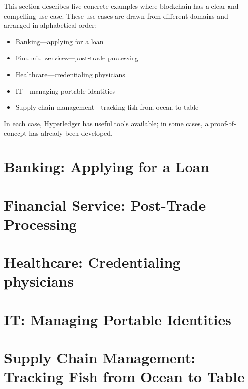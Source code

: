 This section describes five concrete examples where blockchain has a clear and compelling use case. 
These use cases are drawn from different domains and arranged in alphabetical order: 
\begin{itemize}
\item Banking---applying for a loan
\item Financial services---post-trade processing
\item Healthcare---credentialing physicians
\item IT---managing portable identities
\item Supply chain management---tracking fish from ocean to table
 \end{itemize}
 
In each case, Hyperledger has useful tools available; in some cases, a proof-of-concept has already been developed. 

\section{Banking: Applying for a Loan}

\newpage

\section{Financial Service: Post-Trade Processing}

\newpage

\section{Healthcare: Credentialing physicians}

\newpage

\section{IT: Managing Portable Identities}

\newpage

\section{Supply Chain Management: Tracking Fish from Ocean to Table}

